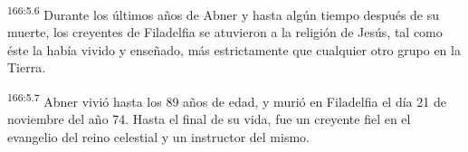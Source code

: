 \par
\textsuperscript{166:5.6} Durante los últimos años de Abner y hasta algún tiempo después de su muerte, los creyentes de Filadelfia se atuvieron a la religión de Jesús, tal como éste la había vivido y enseñado, más estrictamente que cualquier otro grupo en la Tierra.

\par
\textsuperscript{166:5.7} Abner vivió hasta los 89 años de edad, y murió en Filadelfia el día 21 de noviembre del año 74. Hasta el final de su vida, fue un creyente fiel en el evangelio del reino celestial y un instructor del mismo.